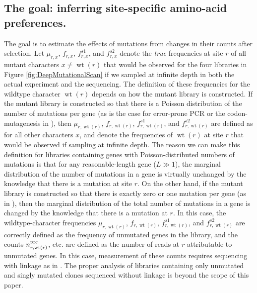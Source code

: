 \documentclass[twocolumn]{bmcart}%
\begin{document}
\subsection*{The goal: inferring site-specific amino-acid preferences.}
The goal is to estimate the effects of mutations from changes in their counts after selection. Let $\mu_{r,x}$, $f_{r,x}$, $f_{r,x}^{s1}$, and $f_{r,x}^{s2}$ denote the \emph{true} frequencies at site $r$ of all mutant characters $x \ne \operatorname{wt}\left(r\right)$ that would be observed for the four libraries in Figure \ref{fig:DeepMutationalScan} if we sampled at infinite depth in both the actual experiment and the sequencing. The definition of these frequencies for the wildtype character $\operatorname{wt}\left(r\right)$ depends on how the mutant library is constructed. If the mutant library is constructed so that there is a Poisson distribution of the number of mutations per gene (as is the case for error-prone PCR or the codon-mutagenesis in \cite{bloom2014experimentally,thyagarajan2014inherent}), then $\mu_{r,\operatorname{wt}\left(r\right)}$, $f_{r,\operatorname{wt}\left(r\right)}$, $f_{r,\operatorname{wt}\left(r\right)}^{s1}$, and $f_{r,\operatorname{wt}\left(r\right)}^{s2}$ are defined as for all other characters $x$, and denote the frequencies of $\operatorname{wt}\left(r\right)$ at site $r$ that would be observed if sampling at infinite depth. The reason we can make this definition for libraries containing genes with Poisson-distributed numbers of mutations is that for any reasonable-length gene ($L \gg 1$), the marginal distribution of the number of mutations in a gene is virtually unchanged by the knowledge that there is a mutation at site $r$. On the other hand, if the mutant library is constructed so that there is exactly zero or one mutation per gene (as in \cite{firnberg2014comprehensive,melnikov2014comprehensive,kitzman2015massively}), then the marginal distribution of the total number of mutations in a gene is changed by the knowledge that there is a mutation at $r$. In this case, the wildtype-character frequencies $\mu_{r,\operatorname{wt}\left(r\right)}$, $f_{r,\operatorname{wt}\left(r\right)}$, $f_{r,\operatorname{wt}\left(r\right)}^{s1}$, and $f_{r,\operatorname{wt}\left(r\right)}^{s2}$ are correctly defined as the frequency of unmutated genes in the library, and the counts $n_{r,\operatorname{wt}\left(r\right)}^{\rm{pre}}$, etc. are defined as the number of reads at $r$ attributable to unmutated genes. In this case, measurement of these counts requires sequencing with linkage as in \cite{hiatt2010parallel,wu2014hiv,kitzman2015massively}. The proper analysis of libraries containing only unmutated and singly mutated clones sequenced without linkage is beyond the scope of this paper.
\end{document}
